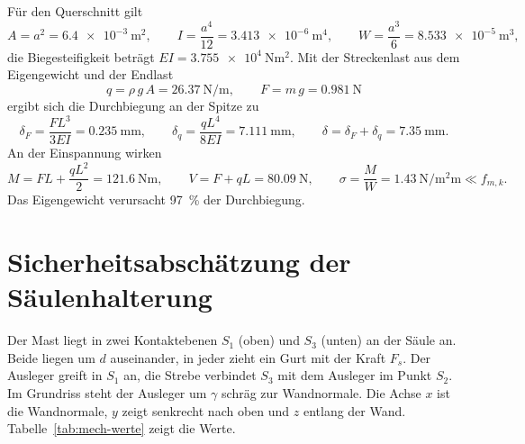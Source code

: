 Für den Querschnitt gilt
\begin{equation}
    A = a^2 = \SI{6,4e-3}{\square\metre}, \qquad
    I = \frac{a^4}{12} = \SI{3,413e-6}{\metre\tothe{4}}, \qquad
    W = \frac{a^3}{6} = \SI{8,533e-5}{\cubic\metre},
\end{equation}
die Biegesteifigkeit beträgt $EI = \SI{3,755e4}{\newton\square\metre}$. Mit der Streckenlast aus dem Eigengewicht und der Endlast
\begin{equation}
    q = \rho \, g \, A = \SI[per-mode=symbol]{26,37}{\newton\per\metre}, \qquad
    F = m \, g = \SI{0,981}{\newton}
\end{equation}
ergibt sich die Durchbiegung an der Spitze zu
\begin{equation}
    \delta_F = \frac{F L^3}{3 E I} = \SI{0,235}{\milli\metre}, \qquad
    \delta_q = \frac{q L^4}{8 E I} = \SI{7,111}{\milli\metre}, \qquad
    \delta = \delta_F + \delta_q = \SI{7,35}{\milli\metre}.
\end{equation}
An der Einspannung wirken
\begin{equation}
    M = F L + \frac{q L^2}{2} = \SI{121,6}{\newton\metre}, \qquad
    V = F + q L = \SI{80,09}{\newton}, \qquad
    \sigma = \frac{M}{W} = \SI[per-mode=symbol]{1,43}{\newton\per\square\milli\metre} \ll f_{m,k}.
\end{equation}
Das Eigengewicht verursacht \SI{97}{\percent} der Durchbiegung.

\section{Sicherheitsabschätzung der Säulenhalterung}
\label{app:mech-sicherheit}
Der Mast liegt in zwei Kontaktebenen $S_1$ (oben) und $S_3$ (unten) an der Säule an. Beide liegen um $d$ auseinander, in jeder zieht ein Gurt mit der Kraft $F_s$. Der Ausleger greift in $S_1$ an, die Strebe verbindet $S_3$ mit dem Ausleger im Punkt $S_2$. Im Grundriss steht der Ausleger um $\gamma$ schräg zur Wandnormale. Die Achse $x$ ist die Wandnormale, $y$ zeigt senkrecht nach oben und $z$ entlang der Wand. Tabelle~\ref{tab:mech-werte} zeigt die Werte.

